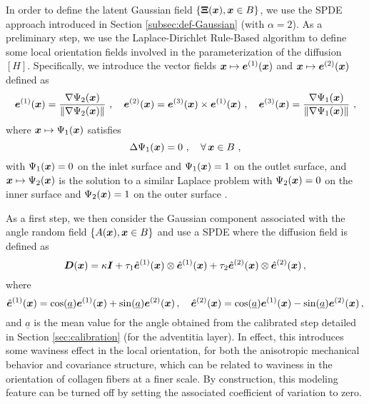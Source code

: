 In order to define the latent Gaussian field $\{{\bf \Xi}(\boldsymbol{x}), \boldsymbol{x} \in B\}$, we use the SPDE approach introduced in Section \ref{subsec:def-Gaussian} (with $\alpha = 2$). As a preliminary step, we use the Laplace-Dirichlet Rule-Based algorithm \cite{Bayer2012,Augustin2014} to define some local orientation fields involved in the parameterization of the diffusion $[H]$. Specifically, we introduce the vector fields $\boldsymbol{x} \mapsto \boldsymbol{e}^{(1)}(\boldsymbol{x})$ and $\boldsymbol{x} \mapsto \boldsymbol{e}^{(2)}(\boldsymbol{x})$ defined as
\begin{equation}
\boldsymbol{e}^{(1)}(\boldsymbol{x}) = \frac{\nabla\Psi_2(\boldsymbol{x})}{ \| \nabla \Psi_2(\boldsymbol{x}) \| }~, \quad \boldsymbol{e}^{(2)}(\boldsymbol{x}) = \boldsymbol{e}^{(3)}(\boldsymbol{x}) \times \boldsymbol{e}^{(1)}(\boldsymbol{x})~, \quad \boldsymbol{e}^{(3)}(\boldsymbol{x}) = \frac{\nabla \Psi_1(\boldsymbol{x})}{ \| \nabla \Psi_1(\boldsymbol{x}) \| }~,
\end{equation}
where $\boldsymbol{x} \mapsto \Psi_1(\boldsymbol{x})$ satisfies 
\begin{equation}
\Delta \Psi_1({\boldsymbol{x}}) = 0~, \quad \forall \, {\boldsymbol{x}} \in B~,
\end{equation}
with $\Psi_1({\boldsymbol{x}}) = 0$ on the inlet surface and $\Psi_1({\boldsymbol{x}}) = 1$ on the outlet surface, and $\boldsymbol{x} \mapsto \Psi_2(\boldsymbol{x})$ is the solution to a similar Laplace problem with $\Psi_2({\boldsymbol{x}}) = 0$ on the inner surface and $\Psi_2({\boldsymbol{x}}) = 1$ on the outer surface \cite{STABER201894}.

As a first step, we then consider the Gaussian component associated with the angle random field $\{A(\boldsymbol{x}), \boldsymbol{x} \in B\}$ and use a SPDE where the diffusion field is defined as
\begin{equation}\label{eq:def-H-final-application}
    \boldsymbol{D}(\boldsymbol{x}) = \kappa \boldsymbol{I} + \tau_1 \hat{\boldsymbol{e}}^{(1)}(\boldsymbol{x}) \otimes \hat{\boldsymbol{e}}^{(1)}(\boldsymbol{x}) + \tau_2 \hat{\boldsymbol{e}}^{(2)}(\boldsymbol{x}) \otimes \hat{\boldsymbol{e}}^{(2)}(\boldsymbol{x})\,,
\end{equation}
where
\begin{equation}    
    \hat{\boldsymbol{e}}^{(1)}(\boldsymbol{x}) = \cos(\underline{a}) \boldsymbol{e}^{(1)}(\boldsymbol{x}) + \sin(\underline{a})\boldsymbol{e}^{(2)}(\boldsymbol{x})\,, \quad \hat{\boldsymbol{e}}^{(2)}(\boldsymbol{x}) = \cos(\underline{a}) \boldsymbol{e}^{(1)}(\boldsymbol{x}) - \sin(\underline{a})\boldsymbol{e}^{(2)}(\boldsymbol{x})\,,
\end{equation}
and $\underline{a}$ is the mean value for the angle obtained from the calibrated step detailed in Section \ref{sec:calibration} (for the adventitia layer). In effect, this introduces some waviness effect in the local orientation, for both the anisotropic mechanical behavior and covariance structure, which can be related to waviness in the orientation of collagen fibers at a finer scale. By construction, this modeling feature can be turned off by setting the associated coefficient of variation to zero.

